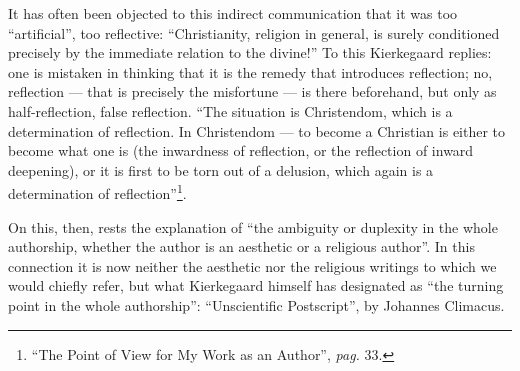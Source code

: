 \documentclass[12pt,a4paper]{book}
\newcommand{\opage}[1]{\marginnote{\footnotesize\textit{[#1]}}}
\begin{document}
It has often been objected to this indirect communication that it was too
``artificial'', too reflective: ``Christianity, religion in general, is surely
conditioned precisely by the immediate relation to the divine!'' To this
Kierkegaard replies: one is mistaken in thinking that it is the remedy that
introduces reflection; no, reflection --- that is precisely the misfortune ---
is there beforehand, but only as half-reflection,
\opage{20}\setcounter{footnote}{0}%
false reflection. ``The situation is Christendom, which is a determination of
reflection. In Christendom --- to become a Christian is either to become what
one is (the inwardness of reflection, or the reflection of inward deepening),
or it is first to be torn out of a delusion, which again is a determination of
reflection''\footnote{``The Point of View for My Work as an Author'',
\textit{pag.} 33.}.

On this, then, rests the explanation of ``the ambiguity or duplexity in the
whole authorship, whether the author is an aesthetic or a religious author''.
In this connection it is now neither the aesthetic nor the religious writings
to which we would chiefly refer, but what Kierkegaard himself has designated
as ``the turning point in the whole authorship'': ``Unscientific Postscript'',
by Johannes Climacus.
\end{document}
